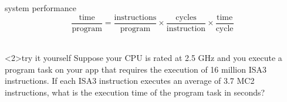 \documentclass[10pt,t,svgnames]{beamer}
\begin{document}
  \begin{frame}{system performance}
    $$\frac{\textrm{time}}{\textrm{program}}=\frac{\textrm{instructions}}{\textrm{program}}\times\frac{\textrm{cycles}}{\textrm{instruction}}\times\frac{\textrm{time}}{\textrm{cycle}}$$\\[2\baselineskip]

    \begin{block}<2>{try it yourself}
      Suppose your CPU is rated at 2.5 GHz and you execute a program task on
      your app that requires the execution of 16 million ISA3 instructions. If
      each ISA3 instruction executes an average of 3.7 MC2 instructions, what is
      the execution time of the program task in seconds?
    \end{block}

  \end{frame}
\end{document}
